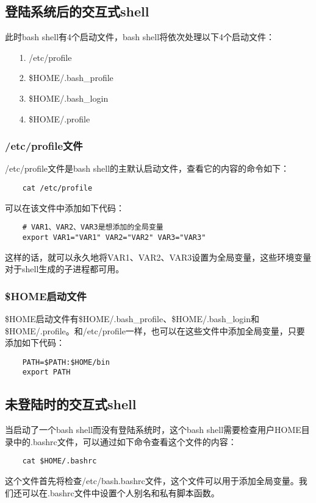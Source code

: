\documentclass[a4paper,left=2.5cm,right=2.5cm,11pt]{article}
\begin{document}
\subsection{登陆系统后的交互式shell}
	此时bash shell有4个启动文件，bash shell将依次处理以下4个启动文件：
	\begin{itemize}
		\item[1.] /etc/profile
		\item[2.] \$HOME/.bash\_profile
		\item[3.] \$HOME/.bash\_login
		\item[4.] \$HOME/.profile
	\end{itemize}

\subsubsection{/etc/profile文件}
	/etc/profile文件是bash shell的主默认启动文件，查看它的内容的命令如下：
	\begin{lstlisting}
	cat /etc/profile
	\end{lstlisting}

	可以在该文件中添加如下代码：
	\begin{lstlisting}
	# VAR1、VAR2、VAR3是想添加的全局变量
	export VAR1="VAR1" VAR2="VAR2" VAR3="VAR3"
	\end{lstlisting}

	这样的话，就可以永久地将VAR1、VAR2、VAR3设置为全局变量，这些环境变量对于shell生成的子进程都可用。

\subsubsection{\$HOME启动文件}
	\$HOME启动文件有\$HOME/.bash\_profile、\$HOME/.bash\_login和\$HOME/.profile。和/etc/profile一样，也可以在这些文件中添加全局变量，只要添加如下代码：
	\begin{lstlisting}
	PATH=$PATH:$HOME/bin
	export PATH
	\end{lstlisting}

\subsection{未登陆时的交互式shell}
	当启动了一个bash shell而没有登陆系统时，这个bash shell需要检查用户HOME目录中的.bashrc文件，可以通过如下命令查看这个文件的内容：
	\begin{lstlisting}
	cat $HOME/.bashrc
	\end{lstlisting}

	这个文件首先将检查/etc/bash.bashrc文件，这个文件可以用于添加全局变量。我们还可以在.bashrc文件中设置个人别名和私有脚本函数。
\end{document}
